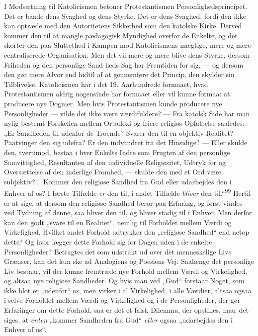 \documentclass[12pt,a4paper,openany]{book}
\newcommand{\opage}[1]{\marginnote{\footnotesize\textit{[#1]}}}
\begin{document}
I Modsætning til Katolicismen betoner Protestantismen
Personlighedsprincipet. Det er baade dens Svaghed og dens Styrke. Det er
dens Svaghed, fordi den ikke kan optræde med den Autoritetens Sikkerhed
som den katolske Kirke. Derved kommer den til at mangle pædagogisk
Myndighed overfor de Enkelte, og det skorter den paa Sluttethed i Kampen
mod Katolicismens mægtige, mere og mere centraliserede Organisation. Men
det vil mere og mere blive dens Styrke, dersom Friheden og den
personlige Sand%
\opage{202}heds Sag har Fremtiden for sig, --- og dersom den gør mere
Alvor end hidtil af at gennemføre det Princip, den skylder sin
Tilblivelse. Katolicismen har i det 19. Aarhundrede formaaet, hvad
Protestantismen aldrig nogensinde har formaaet eller vil kunne formaa:
at producere nye Dogmer. Men hvis Protestantismen kunde producere nye
Personligheder --- vilde det ikke være værdifuldere? --- Fra katolsk
Side har man nylig bestemt Forskellen mellem Ortodoxi og friere religiøs
Opfattelse saaledes: „Er Sandheden til udenfor de Troende? Svarer den
til en objektiv Realitet? Paatvinger den sig udefra? Er den indvandret
fra det Hinsidige? --- Eller skulde den, tvertimod, bestaa i hver
Enkelts Indre som Frugten af den personlige Samvittighed, Resultanten af
den individuelle Religiøsitet, Udtryk for og Oversættelse af den
inderlige Fromhed, --- skulde den med et Ord være subjektiv?... Kommer
den religiøse Sandhed fra Gud eller udarbejdes den i Enhver af os? I
første Tilfælde \textit{er} den til, i andet Tilfælde \textit{bliver}
den til.“\textsuperscript{99} Hertil er at sige, at dersom den religiøse
Sandhed beror paa Erfaring, og først vindes ved Tydning af denne, saa
bliver den til, og bliver stadig til i Enhver. Men derfor kan den godt
„svare til en Realitet“, nemlig til Forholdet mellem Værdi og
Virkelighed. Hvilket andet Forhold udtrykker den „religiøse Sandhed“ end
netop dette? Og hvor lægger dette Forhold sig for Dagen uden i de
enkelte Personligheder? Betragtes det som udstrakt ud over det
menneskelige Livs Grænser, kan det kun ske ad Analogiens og Poesiens
Vej. Saalænge det personlige Liv bestaar, vil der kunne fremtræde nye
Forhold mellem Værdi og Virkelighed, og altsaa nye religiøse Sandheder.
Og hvis man ved „Gud“ forstaar Noget, som ikke blot er „udenfor“ os, men
virker i al Virkelighed, i alle Værdier, altsaa ogsaa i selve Forholdet
mellem Værdi og Virkelighed og i de Personligheder, der gør Erfaringer
om dette Forhold, saa er det et falsk Dilemma, der opstilles, naar det
siges, at \textit{enten} „kommer Sandheden fra Gud“ \textit{eller} ogsaa
„udarbejdes den i Enhver af os“.
\end{document}
